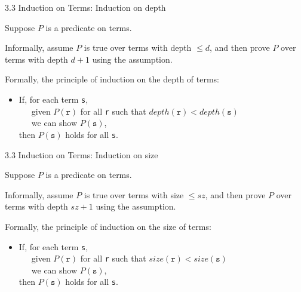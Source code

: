 \documentclass[table]{beamer}
\begin{document}
\begin{frame}[t]{3.3 Induction on Terms: Induction on depth} 

Suppose $P$ is a predicate on terms. 

\vspace{10pt}

Informally, assume $P$ is true over terms with depth $\leq d$, and then prove $P$ over terms with depth $d+1$ using the assumption.


\vspace{10pt}

Formally, the principle of induction on the depth of terms:
\begin{itemize}
\item If, for each term \texttt{s}, \\
 \ \ \ given $P(\texttt{r})$ for all \texttt{r} such that $depth(\texttt{r})<depth(\texttt{s})$ \\
 \ \ \ we can show $P(\texttt{s})$, \\
 then $P(\texttt{s})$ holds for all \texttt{s}.
\end{itemize}

\end{frame}

\begin{frame}[t]{3.3 Induction on Terms: Induction on size} 

Suppose $P$ is a predicate on terms. 

\vspace{10pt}

Informally, assume $P$ is true over terms with size $\leq sz$, and then prove $P$ over terms with depth $sz+1$ using the assumption.


\vspace{10pt}

Formally, the principle of induction on the size of terms:
\begin{itemize}
\item If, for each term \texttt{s}, \\
 \ \ \ given $P(\texttt{r})$ for all \texttt{r} such that $size(\texttt{r})<size(\texttt{s})$ \\
 \ \ \ we can show $P(\texttt{s})$, \\
 then $P(\texttt{s})$ holds for all \texttt{s}.
\end{itemize}

\end{frame}
\end{document}
